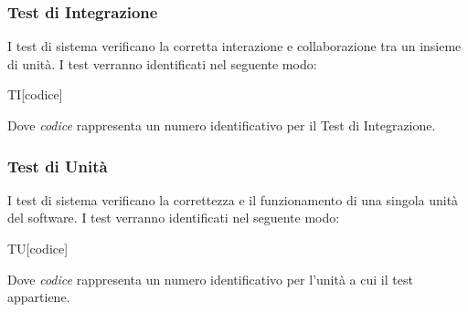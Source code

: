 \documentclass[../piano-di-qualifica.tex]{subfiles}
\begin{document}
  \subsubsection{Test di Integrazione}%
  \label{subs:integrazione}
    I test di sistema verificano la corretta interazione e collaborazione tra un insieme di unità. I test verranno identificati nel seguente modo:
    \begin{center}
      TI[codice]
    \end{center}
    Dove \textit{codice} rappresenta un numero identificativo per il Test di Integrazione.
  \subsubsection{Test di Unità}%
  \label{subs:unita}
    I test di sistema verificano la correttezza e il funzionamento di una singola unità del software. I test verranno identificati nel seguente modo:
    \begin{center}
      TU[codice]
    \end{center}
    Dove \textit{codice} rappresenta un numero identificativo per l'unità a cui il test appartiene.
  
\end{document}
